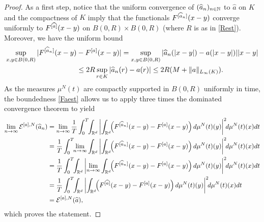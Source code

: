 \begin{proof}
As a first step, notice that the uniform convergence of $(\widehat a_n)_{n \in \mathbb{N}}$ to $\widehat a$ on $K$ and the compactness of $K$ imply that the functionals $F^{[\widehat a_n]}(x-y)$ converge uniformly to $F^{[\widehat a]}(x-y)$ on $B(0,R)\times B(0,R)$ (where $R$ is as in \eqref{Rest}). Moreover, we have the uniform bound
\begin{align}
\begin{split}\label{Faest}
\sup_{x,y\in B(0,R)}|F^{[\widehat a_n]}(x-y) &- F^{[a]}(x-y)| = \sup_{x,y\in B(0,R)}|\widehat a_n(|x-y|) -  a(|x-y|)| |x-y| \\
&\leq 2R \sup_{r\in K} |\widehat a_n(r) -  a(r)|
 \leq 2R(M + \|a\|_{L_{\infty}(K)}).
\end{split}
\end{align}
As the measures $\mu^N(t)$ are compactly supported in $B(0,R)$ uniformly in time, the boundedness \eqref{Faest} allows us to apply three times the dominated convergence theorem to yield
\begin{align*}
\lim_{n \rightarrow \infty}  \mathcal E^{[a],N} (\widehat a_n) &= \lim_{n \rightarrow \infty}\frac{1}{T}\int_0^T\!\!\int_{\R^d} \left| \int_{\R^d}
			\!\!\left(\Fun{\widehat a_n}(x-y)-\Fun{a}(x-y)\right)d\mu^N(t)(y)\right|^2\!\!d\mu^N(t)(x) dt\\
			&= \frac{1}{T}\int_0^T\!\!\lim_{n \rightarrow \infty}\int_{\R^d} \left| \int_{\R^d}
			\!\!\left(\Fun{\widehat a_n}(x-y)-\Fun{a}(x-y)\right)d\mu^N(t)(y)\right|^2\!\! d\mu^N(t)(x) dt\\
			&= \frac{1}{T}\int_0^T\!\!\int_{\R^d} \left| \lim_{n \rightarrow \infty}\int_{\R^d}
			\!\!\left(\Fun{\widehat a_n}(x-y)-\Fun{a}(x-y)\right)d\mu^N(t)(y)\right|^2\!\! d\mu^N(t)(x) dt\\
			&= \frac{1}{T}\int_0^T\!\!\int_{\R^d} \left| \int_{\R^d}
			\!\!\left(\Fun{\widehat a}(x-y)-\Fun{a}(x-y)\right)d\mu^N(t)(y)\right|^2\!\! d\mu^N(t)(x) dt\\
			&=  \Eahatn,
\end{align*}
which proves the statement.





\end{proof}
